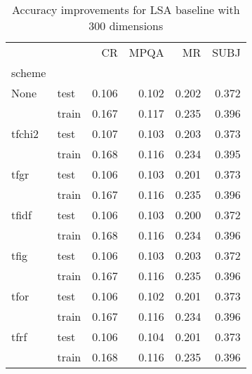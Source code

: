 \begin{table}[h]
\begin{center}

\begin{tabular}{llrrrr}
\toprule
{} &      &  CR &  MPQA &  MR &  SUBJ \\
scheme &  &            &              &            &              \\
\midrule
None & test &      0.106 &        0.102 &      0.202 &        0.372 \\
{} & train &      0.167 &        0.117 &      0.235 &        0.396 \\
tfchi2 & test &      0.107 &        0.103 &      0.203 &        0.373 \\
{} & train &      0.168 &        0.116 &      0.234 &        0.395 \\
tfgr & test &      0.106 &        0.103 &      0.201 &        0.373 \\
{} & train &      0.167 &        0.116 &      0.235 &        0.396 \\
tfidf & test &      0.106 &        0.103 &      0.200 &        0.372 \\
{} & train &      0.168 &        0.116 &      0.234 &        0.396 \\
tfig & test &      0.106 &        0.103 &      0.203 &        0.372 \\
{} & train &      0.167 &        0.116 &      0.235 &        0.396 \\
tfor & test &      0.106 &        0.102 &      0.201 &        0.373 \\
{} & train &      0.167 &        0.116 &      0.234 &        0.396 \\
tfrf & test &      0.106 &        0.104 &      0.201 &        0.373 \\
{} & train &      0.168 &        0.116 &      0.235 &        0.396 \\
\bottomrule
\end{tabular}

\caption[Accuracy improvements for LSA baseline with 300 dimensions]{Accuracy improvements for LSA baseline with 300 dimensions}
\label{tab:lsa:resuts:300}
\end{center}
\end{table}




